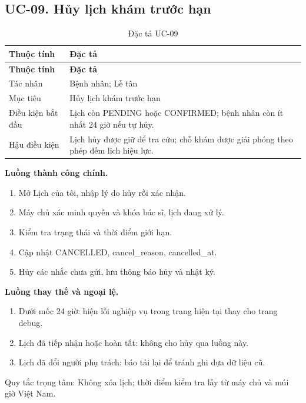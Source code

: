 \clearpage

\subsection{UC-09.\allowbreak{} Hủy lịch khám trước hạn}
\label{uc:9}

{\small\setlength{\tabcolsep}{3pt}\renewcommand{\arraystretch}{1.12}
\begin{longtable}{@{}L{\textwidth-1.32pt\relax} L{\textwidth-4.68pt\relax}@{}}
\caption{Đặc tả UC-09}\\
\toprule
\textbf{Thuộc tính} & \textbf{Đặc tả}\\\midrule
\endfirsthead
\toprule
\textbf{Thuộc tính} & \textbf{Đặc tả}\\\midrule
\endhead
\bottomrule\endlastfoot
Tác nhân & Bệnh nhân; Lễ tân\\[3pt]
Mục tiêu & Hủy lịch khám trước hạn\\[3pt]
Điều kiện bắt đầu & Lịch còn PENDING hoặc CONFIRMED; bệnh nhân còn ít nhất 24 giờ nếu tự hủy.\allowbreak{}\\[3pt]
Hậu điều kiện & Lịch hủy được giữ để tra cứu; chỗ khám được giải phóng theo phép đếm lịch hiệu lực.\allowbreak{}\\[3pt]
\end{longtable}}
\noindent\textbf{Luồng thành công chính.}
\begin{enumerate}
\item Mở Lịch của tôi, nhập lý do hủy rồi xác nhận.\allowbreak{}
\item Máy chủ xác minh quyền và khóa bác sĩ, lịch đang xử lý.\allowbreak{}
\item Kiểm tra trạng thái và thời điểm giới hạn.\allowbreak{}
\item Cập nhật CANCELLED, cancel\_\allowbreak{}reason, cancelled\_\allowbreak{}at.\allowbreak{}
\item Hủy các nhắc chưa gửi, lưu thông báo hủy và nhật ký.\allowbreak{}
\end{enumerate}
\noindent\textbf{Luồng thay thế và ngoại lệ.}
\begin{enumerate}
\item Dưới mốc 24 giờ:\allowbreak{} hiện lỗi nghiệp vụ trong trang hiện tại thay cho trang debug.\allowbreak{}
\item Lịch đã tiếp nhận hoặc hoàn tất:\allowbreak{} không cho hủy qua luồng này.\allowbreak{}
\item Lịch đã đổi người phụ trách:\allowbreak{} báo tải lại để tránh ghi dựa dữ liệu cũ.\allowbreak{}
\end{enumerate}
Quy tắc trọng tâm:\allowbreak{} Không xóa lịch; thời điểm kiểm tra lấy từ máy chủ và múi giờ Việt Nam.\allowbreak{}

